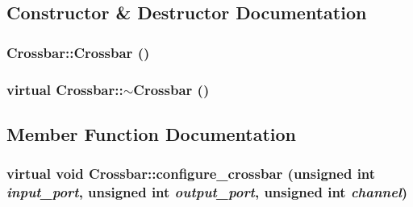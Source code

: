 \subsection{Constructor \& Destructor Documentation}
\hypertarget{classCrossbar_4093a8bf3894e372d4fa9ce06f2abf3d}{
\subsubsection[{Crossbar}]{\setlength{\rightskip}{0pt plus 5cm}Crossbar::Crossbar ()}}
\label{classCrossbar_4093a8bf3894e372d4fa9ce06f2abf3d}


\hypertarget{classCrossbar_7debf5ed12155b31a21b13fff53357a6}{
\subsubsection[{$\sim$Crossbar}]{\setlength{\rightskip}{0pt plus 5cm}virtual Crossbar::$\sim$Crossbar ()}}
\label{classCrossbar_7debf5ed12155b31a21b13fff53357a6}




\subsection{Member Function Documentation}
\hypertarget{classCrossbar_8a7a059788ee336f171eb1d3c7be3110}{
\subsubsection[{configure\_\-crossbar}]{\setlength{\rightskip}{0pt plus 5cm}virtual void Crossbar::configure\_\-crossbar (unsigned int {\em input\_\-port}, \/  unsigned int {\em output\_\-port}, \/  unsigned int {\em channel})}}
\label{classCrossbar_8a7a059788ee336f171eb1d3c7be3110}




